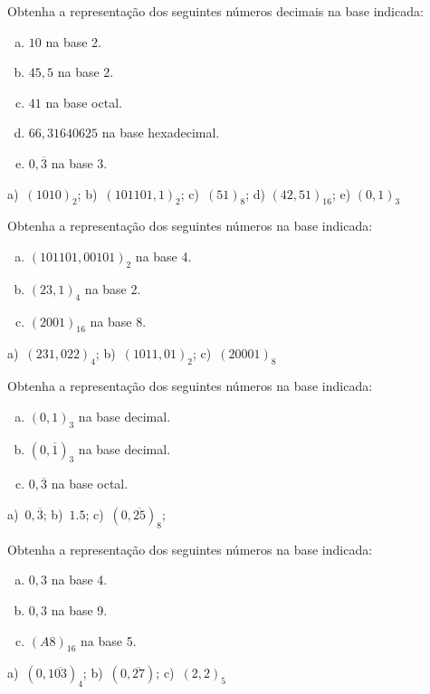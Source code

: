 \begin{exer}
  Obtenha a representação dos seguintes números decimais na base indicada:
  \begin{enumerate}[a)]
  \item $10$ na base 2.
  \item $45,5$ na base 2.
  \item $41$ na base octal.
  \item $66,31640625$ na base hexadecimal.
  \item $0,\overline{3}$ na base 3.
  \end{enumerate}
\end{exer}
\begin{resp}
  a)~$(1010)_2$; b)~$(101101,1)_2$; c)~$(51)_8$; d) $(42,51)_{16}$; e) $(0,1)_3$
\end{resp}

\begin{exer}
  Obtenha a representação dos seguintes números na base indicada:
  \begin{enumerate}[a)]
  \item $(101101,00101)_2$ na base 4.
  \item $(23,1)_4$ na base 2.
  \item $(2001)_{16}$ na base 8.
  \end{enumerate}
\end{exer}
\begin{resp}
   a)~$(231,022)_4$; b)~$(1011,01)_2$; c)~$(20001)_8$
\end{resp}

\begin{exer}
  Obtenha a representação dos seguintes números na base indicada:
  \begin{enumerate}[a)]
  \item $(0,1)_3$ na base decimal.
  \item $(0,\overline{1})_3$ na base decimal.
  \item $0,\overline{3}$ na base octal.
  \end{enumerate}
\end{exer}
\begin{resp}
  a)~$0,\overline{3}$; b)~$1.5$; c)~$(0,\overline{25})_8$;
\end{resp}

\begin{exer}
  Obtenha a representação dos seguintes números na base indicada:
  \begin{enumerate}[a)]
  \item $0,3$ na base 4.
  \item $0,3$ na base 9.
  \item $(A8)_{16}$ na base 5.
  \end{enumerate}
\end{exer}
\begin{resp}
  a)~$(0,1\overline{03})_4$; b)~$(0,\overline{27})$; c)~$(2,2)_5$
\end{resp}

